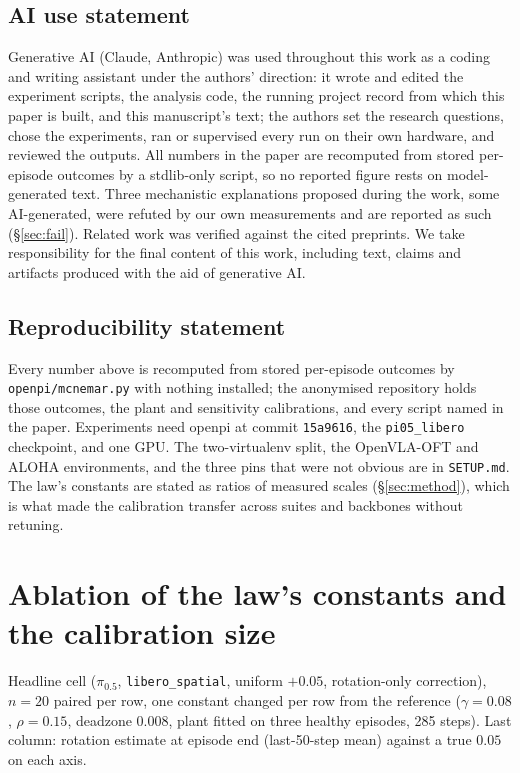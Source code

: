 \documentclass{article}
\newcommand{\code}[1]{\texttt{\small #1}}
\begin{document}
\subsection*{AI use statement}
Generative AI (Claude, Anthropic) was used throughout this work as a coding and writing
assistant under the authors' direction: it wrote and edited the experiment scripts, the
analysis code, the running project record from which this paper is built, and this
manuscript's text; the authors set the research questions, chose the experiments, ran or
supervised every run on their own hardware, and reviewed the outputs. All numbers in the
paper are recomputed from stored per-episode outcomes by a stdlib-only script, so no
reported figure rests on model-generated text. Three mechanistic explanations proposed
during the work, some AI-generated, were refuted by our own measurements and are reported
as such (\S\ref{sec:fail}). Related work was verified against the cited preprints. We take
responsibility for the final content of this work, including text, claims and artifacts
produced with the aid of generative AI.

\subsection*{Reproducibility statement}
Every number above is recomputed from stored per-episode outcomes by \code{openpi/mcnemar.py}
with nothing installed; the anonymised repository holds those outcomes, the plant and
sensitivity calibrations, and every script named in the paper. Experiments need openpi at
commit \code{15a9616}, the \code{pi05\_libero} checkpoint, and one GPU. The two-virtualenv
split, the OpenVLA-OFT and ALOHA environments, and the three pins that were not obvious
are in \code{SETUP.md}. The law's constants are stated as ratios of measured scales
(\S\ref{sec:method}), which is what made the calibration transfer across suites and
backbones without retuning.




\appendix
\section{Ablation of the law's constants and the calibration size}
\label{app:abl}
Headline cell ($\pi_{0.5}$, \code{libero\_spatial}, uniform $+0.05$, rotation-only
correction), $n=20$ paired per row, one constant changed per row from the reference
($\gamma=0.08$, $\rho=0.15$, deadzone $0.008$, plant fitted on three healthy episodes,
285 steps). Last column: rotation estimate at episode end (last-50-step mean) against a
true $0.05$ on each axis.
\end{document}
